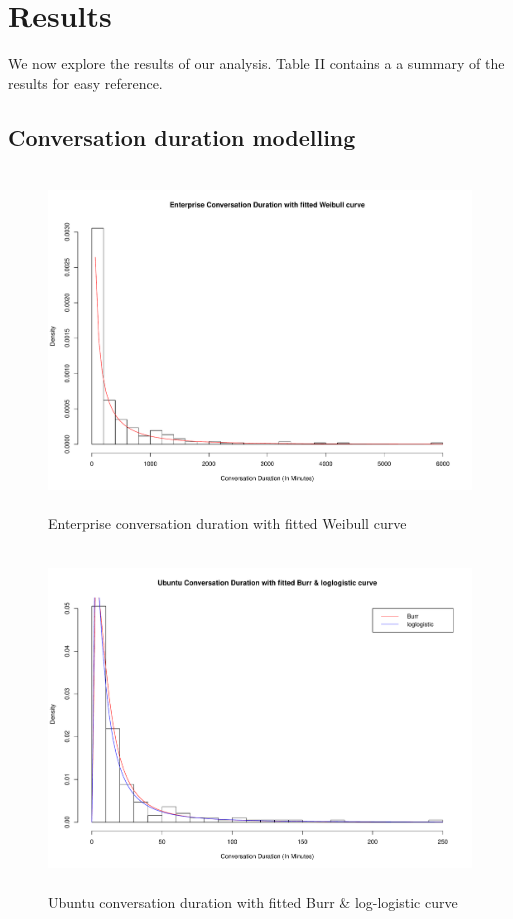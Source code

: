 \section{Results}

We now explore the results of our analysis. Table II contains a a summary of the results for easy reference.

\subsection{Conversation duration modelling}

\begin{figure}
\begin{center}
\caption{Enterprise conversation duration with fitted Weibull curve}
\label{fig:chap6fig1}
\includegraphics[height=9cm, width=13cm]{graphs/different/01_duration_enterprise.pdf} 
\end{center}
\end{figure}

\begin{figure}
\begin{center}
\caption{Ubuntu conversation duration with fitted Burr & log-logistic curve}
\label{fig:chap6fig2}
\includegraphics[height=9cm, width=13cm]{graphs/different/02_duration_ubuntu.pdf}
\end{center}
\end{figure}

